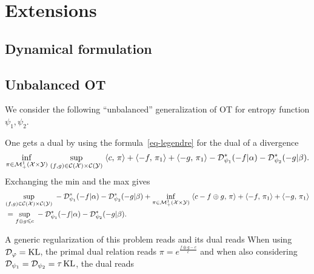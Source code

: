 
\section{Extensions}

\subsection{Dynamical formulation}


\subsection{Unbalanced OT}
\label{sec-unbalanced}

We consider the following ``unbalanced'' generalization of OT
for entropy function $\psi_1,\psi_2$.

One gets a dual by using the formula~\eqref{eq-legendre} for the dual of a divergence
\begin{align*}
	\underset{\pi \in \mathcal{M}_+^1(\mathcal{X} \times \mathcal{Y})}{\inf}\; \underset{(f,g) \in \mathcal{C}(\mathcal{X}) \times \mathcal{C}(\mathcal{Y})}{\sup}\;
		\langle c,\,\pi\rangle + \langle -f,\,\pi_1\rangle + \langle -g,\,\pi_1\rangle - \mathcal{D}_{\psi_1}^*(-f|\alpha) - \mathcal{D}_{\psi_2}^*(-g|\beta). 
\end{align*}
Exchanging the min and the max gives
\begin{align*}
	&\underset{(f,g) \in \mathcal{C}(\mathcal{X}) \times \mathcal{C}(\mathcal{Y})}{\sup}\;
	- \mathcal{D}_{\psi_1}^*(-f|\alpha) - \mathcal{D}_{\psi_2}^*(-g|\beta)	+ 
		\underset{\pi \in \mathcal{M}_+^1(\mathcal{X} \times \mathcal{Y})}{\inf}\; 
		\langle c-f \oplus g,\,\pi\rangle + \langle -f,\,\pi_1\rangle + \langle -g,\,\pi_1\rangle \\
	&= 	\underset{f \oplus g \leqslant c}{\sup}\;
	- \mathcal{D}_{\psi_1}^*(-f|\alpha) - \mathcal{D}_{\psi_2}^*(-g|\beta).
\end{align*}

A generic regularization of this problem reads
and its dual reads 
When using $\mathcal{D}_\varphi=\operatorname{KL}$, the primal dual relation reads $\pi=e^{\frac{f\oplus g - c}{\epsilon}}$ and when also considering $\mathcal{D}_{\psi_1}=\mathcal{D}_{\psi_2} = \tau \operatorname{KL}$, the dual reads

